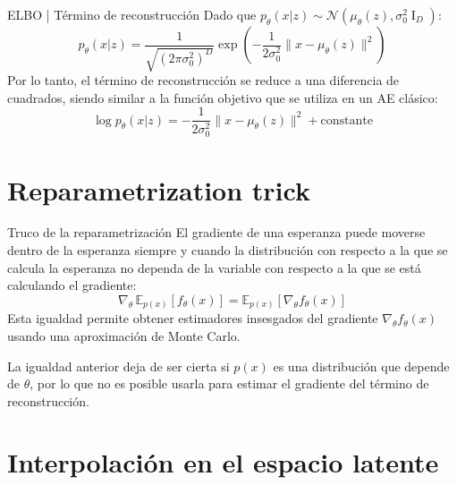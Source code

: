 \documentclass{beamer}
\begin{document}
\begin{frame}{ELBO | Término de reconstrucción}
    Dado que $p_\theta(x|z)\sim\mathcal{N}(\mu_\theta(z),\sigma_0^2\operatorname{I}_D)$:
    \begin{equation*}
        p_\theta(x|z)=\frac{1}{\sqrt{(2\pi\sigma_0^2)^D}}\exp\left(-\frac{1}{2\sigma_0^2}\|x-\mu_\theta(z)\|^2\right)
    \end{equation*}
    Por lo tanto, el término de reconstrucción se reduce a una diferencia de cuadrados, siendo similar a la función objetivo que se utiliza en un AE clásico:
    \begin{equation*}
        \log p_\theta(x|z)=-\frac{1}{2\sigma_0^2}\|x-\mu_\theta(z)\|^2 + \text{constante}
    \end{equation*}
\end{frame}

\section{Reparametrization trick}

\begin{frame}{Truco de la reparametrización}
    El gradiente de una esperanza puede moverse dentro de la esperanza siempre y cuando la distribución con respecto a la que se calcula la esperanza no dependa de la variable con respecto a la que se está calculando el gradiente:
    \begin{equation*}
        \nabla_\theta\,\mathbb{E}_{p(x)}[f_\theta(x)]=\mathbb{E}_{p(x)}[\nabla_\theta f_\theta(x)]
    \end{equation*}
    Esta igualdad permite obtener estimadores insesgados del gradiente $\nabla_\theta f_\theta(x)$ usando una aproximación de Monte Carlo.

    La igualdad anterior deja de ser cierta si $p(x)$ es una distribución que depende de $\theta$, por lo que no es posible usarla para estimar el gradiente del término de reconstrucción.
\end{frame}

\section{Interpolación en el espacio latente}
\end{document}
